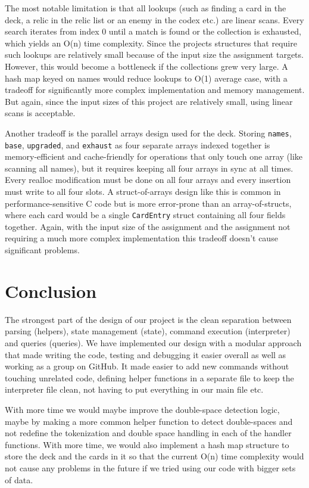 \documentclass[12pt,a4paper]{article}
\begin{document}
The most notable limitation is that all lookups (such as finding a card in the deck, a relic in the relic list or an enemy in the codex etc.) are linear scans. Every search iterates from index 0 until a match is found or the collection is exhausted, which yields an O(n) time complexity. Since the projects structures that require such lookups are relatively small because of the input size the assignment targets. However, this would become a bottleneck if the collections grew very large. A hash map keyed on names would reduce lookups to O(1) average case, with a tradeoff for significantly more complex implementation and memory management. But again, since the input sizes of this project are relatively small, using linear scans is acceptable.

Another tradeoff is the parallel arrays design used for the deck. Storing \texttt{names}, \texttt{base}, \texttt{upgraded}, and \texttt{exhaust} as four separate arrays indexed together is memory-efficient and cache-friendly for operations that only touch one array (like scanning all names), but it requires keeping all four arrays in sync at all times. Every realloc modification must be done on all four arrays and every insertion must write to all four slots. A struct-of-arrays design like this is common in performance-sensitive C code but is more error-prone than an array-of-structs, where each card would be a single \texttt{CardEntry} struct containing all four fields together. Again, with the input size of the assignment and the assignment not requiring a much more complex implementation this tradeoff doesn't cause significant problems.

\section{Conclusion}

The strongest part of the design of our project is the clean separation between parsing (helpers), state management (state), command execution (interpreter) and queries (queries). We have implemented our design with a modular approach that made writing the code, testing and debugging it easier overall as well as working as a group on GitHub. It made easier to add new commands without touching unrelated code, defining helper functions in a separate file to keep the interpreter file clean, not having to put everything in our main file etc.

With more time we would maybe improve the double-space detection logic, maybe by making a more common helper function to detect double-spaces and not redefine the tokenization and double space handling in each of the handler functions. With more time, we would also implement a hash map structure to store the deck and the cards in it so that the current O(n) time complexity would not cause any problems in the future if we tried using our code with bigger sets of data.
\end{document}
